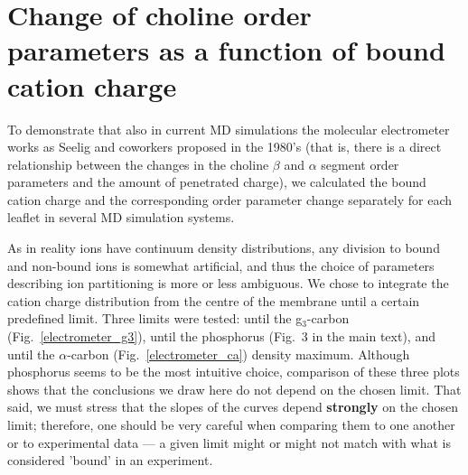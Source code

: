 \documentclass[twoside,twocolumn,9pt]{article}
\begin{document}
\section{Change of choline order parameters as a function of bound cation charge}


To demonstrate that also in current MD simulations the molecular electrometer works as Seelig and coworkers proposed in the 1980's (that is, there is a direct relationship between the changes in the choline $\beta$ and $\alpha$ segment order parameters and the amount of penetrated charge), we calculated the bound cation charge and the corresponding order parameter change separately for each leaflet in several MD simulation systems.

As in reality ions have continuum density distributions, any division to bound and non-bound ions is somewhat artificial,
and thus the choice of parameters describing ion partitioning is more or less ambiguous.
We chose to integrate the cation charge distribution from the centre of the membrane until a certain predefined limit. Three limits were tested:
until the g$_3$-carbon (Fig.~\ref{electrometer_g3}), until the phosphorus (Fig.~3 in the main text), and until the $\alpha$-carbon (Fig.~\ref{electrometer_ca}) density maximum. Although phosphorus seems to be the most intuitive choice, comparison of these three plots shows that the conclusions we draw here do not depend on the chosen limit.
That said, we must stress that the slopes of the curves depend {\bf strongly} on the chosen limit; therefore, one should be very careful when comparing them to one another or to experimental data --- a given limit might or might not match with what is considered 'bound' in an experiment.
\end{document}

